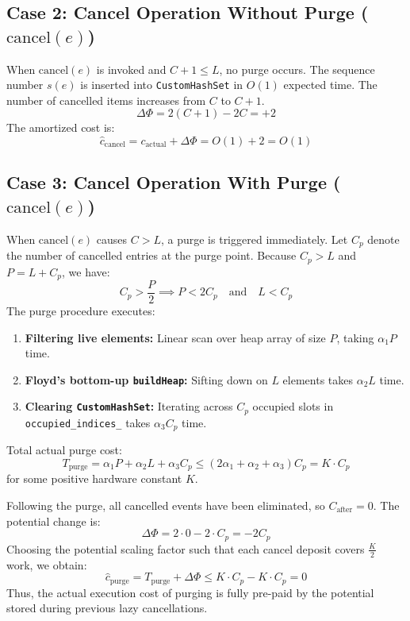 \documentclass[11pt,a4paper]{article}
\begin{document}
\subsection{Case 2: Cancel Operation Without Purge ($\text{cancel}(e)$)}
When $\text{cancel}(e)$ is invoked and $C + 1 \le L$, no purge occurs. The sequence number $s(e)$ is inserted into \texttt{CustomHashSet} in $O(1)$ expected time. The number of cancelled items increases from $C$ to $C + 1$.
\begin{equation}
\Delta\Phi = 2(C + 1) - 2C = +2
\end{equation}
The amortized cost is:
\begin{equation}
\widehat{c}_{\text{cancel}} = c_{\text{actual}} + \Delta\Phi = O(1) + 2 = O(1)
\end{equation}

\subsection{Case 3: Cancel Operation With Purge ($\text{cancel}(e)$)}
When $\text{cancel}(e)$ causes $C > L$, a purge is triggered immediately. Let $C_p$ denote the number of cancelled entries at the purge point. Because $C_p > L$ and $P = L + C_p$, we have:
\begin{equation}
C_p > \frac{P}{2} \implies P < 2C_p \quad \text{and} \quad L < C_p
\end{equation}
The purge procedure executes:
\begin{enumerate}
    \item \textbf{Filtering live elements:} Linear scan over heap array of size $P$, taking $\alpha_1 P$ time.
    \item \textbf{Floyd's bottom-up \texttt{buildHeap}:} Sifting down on $L$ elements takes $\alpha_2 L$ time.
    \item \textbf{Clearing \texttt{CustomHashSet}:} Iterating across $C_p$ occupied slots in \texttt{occupied\_indices\_} takes $\alpha_3 C_p$ time.
\end{enumerate}
Total actual purge cost:
\begin{equation}
T_{\text{purge}} = \alpha_1 P + \alpha_2 L + \alpha_3 C_p \le (2\alpha_1 + \alpha_2 + \alpha_3) C_p = K \cdot C_p
\end{equation}
for some positive hardware constant $K$.

Following the purge, all cancelled events have been eliminated, so $C_{\text{after}} = 0$. The potential change is:
\begin{equation}
\Delta\Phi = 2 \cdot 0 - 2 \cdot C_p = -2C_p
\end{equation}
Choosing the potential scaling factor such that each cancel deposit covers $\frac{K}{2}$ work, we obtain:
\begin{equation}
\widehat{c}_{\text{purge}} = T_{\text{purge}} + \Delta\Phi \le K \cdot C_p - K \cdot C_p = 0
\end{equation}
Thus, the actual execution cost of purging is fully pre-paid by the potential stored during previous lazy cancellations.
\end{document}
